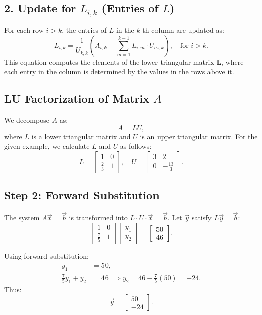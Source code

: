 \documentclass[journal]{IEEEtran}
\newcommand{\myvec}[1]{\begin{bmatrix}#1\end{bmatrix}}
\begin{document}
\subsection*{2. Update for \( L_{i,k} \) (Entries of \( L \))}
For each row \( i > k \), the entries of \( L \) in the \( k \)-th column are updated as:  
\[
L_{i,k} = \frac{1}{U_{k,k}} \left( A_{i,k} - \sum_{m=1}^{k-1} L_{i,m} \cdot U_{m,k} \right), \quad \text{for } i > k.
\]
This equation computes the elements of the lower triangular matrix \( \mathbf{L} \), where each entry in the column is determined by the values in the rows above it.

\subsection*{LU Factorization of Matrix \( A \)}
We decompose \( A \) as:
\[
A = LU,
\]
where \( L \) is a lower triangular matrix and \( U \) is an upper triangular matrix.  
For the given example, we calculate \( L \) and \( U \) as follows:
\[
L = \begin{bmatrix} 1 & 0 \\ \frac{2}{3} & 1 \end{bmatrix}, \quad 
U = \begin{bmatrix} 3 & 2 \\ 0 & -\frac{13}{3} \end{bmatrix}.
\]

\subsection{Step 2: Forward Substitution}
The system \(A\vec{x} = \vec{b}\) is transformed into \(L \cdot U \cdot \vec{x} = \vec{b}\). Let \(\vec{y}\) satisfy \(L\vec{y} = \vec{b}\):
\begin{equation}
    \myvec{1 & 0 \\ \frac{7}{5} & 1} \myvec{y_1 \\ y_2} = \myvec{50 \\ 46}.
\end{equation}

Using forward substitution:
\begin{align}
    y_1 &= 50, \\
    \frac{7}{5}y_1 + y_2 &= 46 \implies y_2 = 46 - \frac{7}{5}(50) = -24.
\end{align}
Thus:
\begin{equation}
    \vec{y} = \myvec{50 \\ -24}.
\end{equation}
\end{document}
